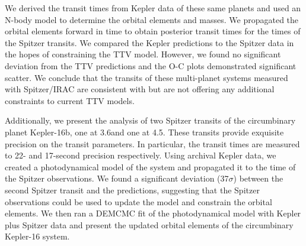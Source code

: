 We derived the transit times from Kepler data of these same planets and used an N-body model to determine the orbital elements and masses. We propagated the orbital elements forward in time to obtain posterior transit times for the times of the Spitzer transits. We compared the Kepler predictions to the Spitzer data in the hopes of constraining the TTV model. However, we found no significant deviation from the TTV predictions and the O-C plots demonstrated significant scatter. We conclude that the transits of these multi-planet systems measured with Spitzer/IRAC are consistent with but are not offering any additional constraints to current TTV models.

Additionally, we present the analysis of two Spitzer transits of the circumbinary planet Kepler-16b, one at 3.6\um and one at 4.5\um. These transits provide exquisite precision on the transit parameters. In particular, the transit times are measured to 22- and 17-second precision respectively. Using archival Kepler data, we created a photodynamical model of the system and propagated it to the time of the Spitzer observations. We found a significant deviation (37$\sigma$) between the second Spitzer transit and the predictions, suggesting that the Spitzer observations could be used to update the model and constrain the orbital elements. We then ran a DEMCMC fit of the photodynamical model with Kepler plus Spitzer data and present the updated orbital elements of the circumbinary Kepler-16 system.

